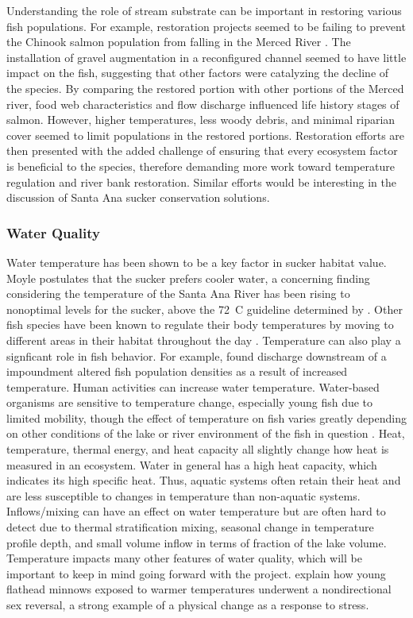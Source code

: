 \documentclass{article}\usepackage[]{graphicx}\usepackage[]{color}
\begin{document}
Understanding the role of stream substrate can be important in restoring various fish populations. For example, restoration projects seemed to be failing to prevent the Chinook salmon population from falling in the Merced River \citep{albertson13}. The installation of gravel augmentation in a reconfigured channel seemed to have little impact on the fish, suggesting that other factors were catalyzing the decline of the species. By comparing the restored portion with other portions of the Merced river, food web characteristics and flow discharge influenced life history stages of salmon. However, higher temperatures, less woody debris, and minimal riparian cover seemed to limit populations in the restored portions. Restoration efforts are then presented with the added challenge of ensuring that every ecosystem factor is beneficial to the species, therefore demanding more work toward temperature regulation and river bank restoration. Similar efforts would be interesting in the discussion of Santa Ana sucker conservation solutions.

\subsubsection{Water Quality}

Water temperature has been shown to be a key factor in sucker habitat value. Moyle \citet{moyle2002inland} postulates that the sucker prefers cooler water, a concerning finding considering the temperature of the Santa Ana River has been rising to nonoptimal levels for the sucker, above the 72\textdegree~C guideline determined by \citet{baskerville2012recovery}. Other fish species have been known to regulate their body temperatures by moving to different areas in their habitat throughout the day \citep{matthews1994cool}. Temperature can also play a signficant role in fish behavior. For example, \citet{sadler1980effect} found discharge downstream of a impoundment altered fish population densities as a result of increased temperature. Human activities can increase water temperature. Water-based organisms are sensitive to temperature change, especially young fish due to limited mobility, though the effect of temperature on fish varies greatly depending on other conditions of the lake or river environment of the fish in question \citep{loshuertos16}. Heat, temperature, thermal energy, and heat capacity all slightly change how heat is measured in an ecosystem. Water in general has a high heat capacity, which indicates its high specific heat. Thus, aquatic systems often retain their heat and are less susceptible to changes in temperature than non-aquatic systems. Inflows/mixing can have an effect on water temperature but are often hard to detect due to thermal stratification mixing, seasonal change in temperature profile depth, and small volume inflow in terms of fraction of the lake volume. Temperature impacts many other features of water quality, which will be important to keep in mind going forward with the project. \citet{coulter2015fluctuating} explain how young flathead minnows exposed to warmer temperatures underwent a nondirectional sex reversal, a strong example of a physical change as a response to stress.
\end{document}
